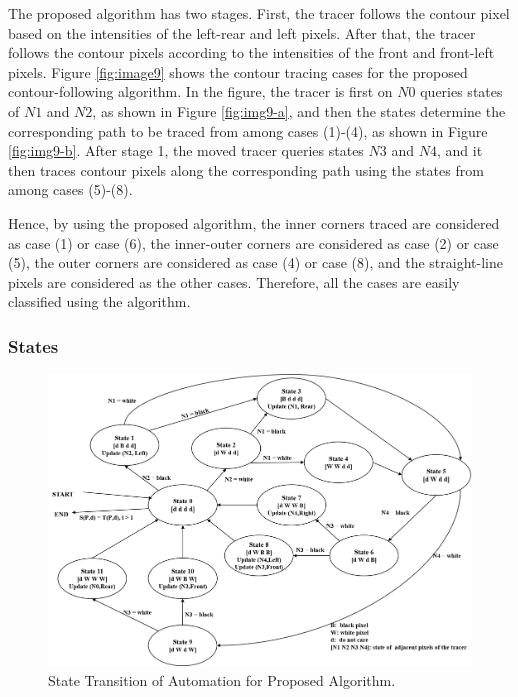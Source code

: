 The proposed algorithm has two stages. First, the tracer follows the contour pixel based on the intensities of the left-rear and left pixels. After that, the tracer follows the contour pixels according to the intensities of the front and front-left pixels. Figure \ref{fig:image9} shows the contour tracing cases for the proposed contour-following algorithm. In the figure, the tracer is first on $N0$ queries states of $N1$ and $N2$, as shown in Figure \ref{fig:img9-a}, and then the states determine the corresponding path to be traced from among cases (1)-(4), as shown in Figure \ref{fig:img9-b}. After stage 1, the moved tracer queries states $N3$ and $N4$, and it then traces contour pixels along the corresponding path using the states from among cases (5)-(8). 


Hence, by using the proposed algorithm, the inner corners traced are considered as case (1) or case (6), the inner-outer corners are considered as case (2) or case (5), the outer corners are considered as case (4) or case (8), and the straight-line pixels are considered as the other cases. Therefore, all the cases are easily classified using the algorithm. 




\subsubsection{States}

\begin{figure}[htbp]
	\centering
	\includegraphics[width=1.0\textwidth]{4.Proposed/state.png}
	\caption{State Transition of Automation for Proposed Algorithm.}
	\label{fig:image10}
\end{figure}


